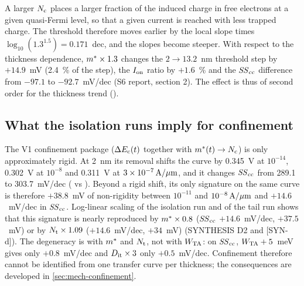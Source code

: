 A larger $N_{\mathrm{c}}$ places a larger fraction of the induced charge in free electrons at a given quasi-Fermi level, so that a given current is reached with less trapped charge. The threshold therefore moves earlier by the local slope times $\log_{10}(1.3^{1.5})=0.171$~dec, and the slopes become steeper. With respect to the thickness dependence, $m^{*}\times1.3$ changes the $2\rightarrow13.2$~nm threshold step by $+14.9$~mV (2.4~\% of the step), the $I_{\mathrm{on}}$ ratio by $+1.6$~\% and the $\mathit{SS}_{\mathrm{cc}}$ difference from $-97.1$ to $-92.7$~mV/dec (S6 report, section 2). The effect is thus of second order for the thickness trend (\evNUM).

\subsection{What the isolation runs imply for confinement}
The V1 confinement package ($\Delta E_{\mathrm{c}}(t)$ together with $m^{*}(t)\rightarrow N_{\mathrm{c}}$) is only approximately rigid. At 2~nm its removal shifts the curve by 0.345~V at $10^{-14}$, 0.302~V at $10^{-8}$ and 0.311~V at $3\times10^{-7}\,\mathrm{A}/\mu\mathrm{m}$, and it changes $\mathit{SS}_{\mathrm{cc}}$ from 289.1 to 303.7~mV/dec ( vs ). Beyond a rigid shift, its only signature on the same curve is therefore $+38.8$~mV of non-rigidity between $10^{-11}$ and $10^{-8}\,\mathrm{A}/\mu\mathrm{m}$ and $+14.6$~mV/dec in $\mathit{SS}_{\mathrm{cc}}$. Log-linear scaling of the isolation run  and of the tail run  shows that this signature is nearly reproduced by $m^{*}\times0.8$ ($\mathit{SS}_{\mathrm{cc}}$ $+14.6$~mV/dec, $+37.5$~mV) or by $N_{\mathrm{t}}\times1.09$ ($+14.6$~mV/dec, $+34$~mV) (SYNTHESIS D2 and [SYN-d]). The degeneracy is with $m^{*}$ and $N_{\mathrm{t}}$, not with $W_{\mathrm{TA}}$: on $\mathit{SS}_{\mathrm{cc}}$, $W_{\mathrm{TA}}+5$~meV gives only $+0.8$~mV/dec and $D_{\mathrm{it}}\times3$ only $+0.5$~mV/dec. Confinement therefore cannot be identified from one transfer curve per thickness; the consequences are developed in \cref{sec:mech-confinement}.

